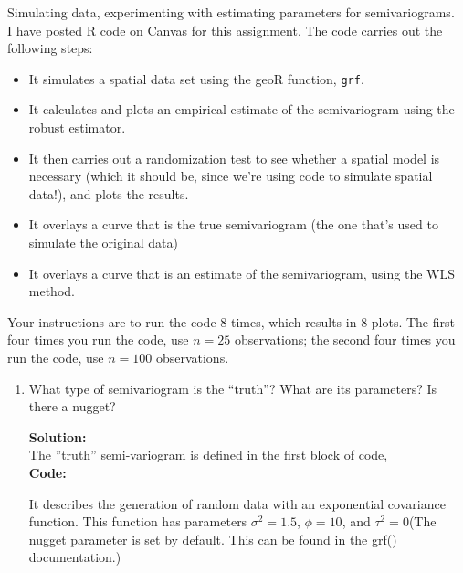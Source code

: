 \documentclass[12pt]{article}
\makeatletter
\theoremstyle{homework}
\newenvironment{exercise}[1]
{\def\@currentlabel{#1}\exercisecore}
{\endexercisecore}
\newcommand{\localhead}[1]{\par\smallskip\noindent\textbf{#1}\nobreak\\}%
\newcommand\solution{\localhead{Solution:}}
\makeatother
\begin{document}
\begin{exercise}{5} Simulating data, experimenting with estimating parameters for semivariograms.\\
  I have posted R code on Canvas for this assignment. The code carries out the following
  steps:
  \begin{itemize}
  \item It simulates a spatial
  data set using the geoR function, \verb+grf+. 
  \item It calculates and plots an empirical
  estimate of the semivariogram using the robust estimator. 
  \item It then carries out a
  randomization test to see whether a spatial model is necessary (which it should be,
  since we're using code to simulate spatial data!), and plots the results.
  \item  It overlays a curve that is the true semivariogram (the one that's used
  to simulate the original data)
  \item It overlays a curve that is an estimate of the semivariogram, using the WLS method.
  \end{itemize}
  
  Your instructions are to run the code 8 times, which results in 8 plots. The first four
  times you run the code, use $n=25$ observations; the second four times you run the
  code, use $n=100$ observations.
  
  \begin{enumerate}

  \item What type of semivariogram is the ``truth''? What are its parameters? Is there a nugget?\\
  \solution The ''truth'' semi-variogram is defined in the first block of code,\\
  \textbf{Code:}
  \begin{center}
  
  \end{center}
  It describes the generation of random data with an exponential covariance function. This function 
  has parameters $\sigma^2 = 1.5$, $\phi = 10$, and $\tau^2 = 0$(The nugget parameter is set by default. This can be found in the grf() documentation.)
  \vspace{.15in}
  
  
  

\end{enumerate}
\end{exercise}
\end{document}
